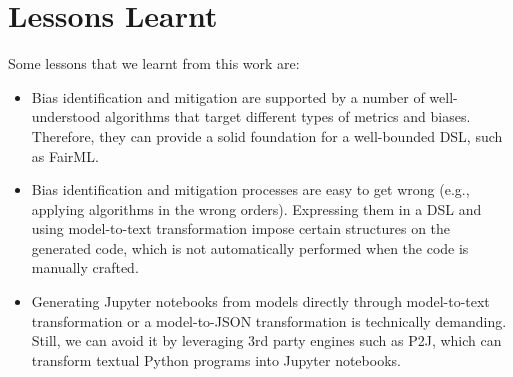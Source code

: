\documentclass[sigconf]{acmart}
\begin{document}
{\section{Lessons Learnt}
\label{sec:lessons_learned}
Some lessons that we learnt from this work are:
\begin{itemize}[leftmargin=*]
	\item Bias identification and mitigation are supported by a number of well-understood algorithms that target different types of metrics and biases. Therefore, they can provide a solid foundation for a well-bounded DSL, such as FairML.
	\item  Bias identification and mitigation processes are easy to get wrong (e.g., applying algorithms in the wrong orders). Expressing them in a DSL and using model-to-text transformation impose certain structures on the generated code, which is not automatically performed when the code is manually crafted. 
	\item Generating Jupyter notebooks from models directly through model-to-text transformation or a model-to-JSON transformation is technically demanding. Still, we can avoid it by leveraging 3rd party engines such as P2J, which can transform textual Python programs into Jupyter notebooks.
\end{itemize}
}
\end{document}
